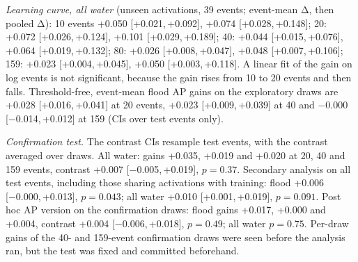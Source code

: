 \documentclass[journal,onecolumn]{IEEEtran}
\newcommand{\ci}[2]{[#1,\,#2]}
\begin{document}
\begin{table}[H]
\caption{Event-mean IoU regressed on $\log_2$ events and $\log_2$ tiles over all 38 exploratory training
draws (unseen activations; two-way 95\% CIs).}
\centering
{}
\end{table}

\emph{Learning curve, all water} (unseen activations, 39 events; event-mean Δ, then pooled Δ): 10 events
+0.050 \ci{+0.021}{+0.092}, +0.074 \ci{+0.028}{+0.148}; 20: +0.072 \ci{+0.026}{+0.124}, +0.101
\ci{+0.029}{+0.189}; 40: +0.044 \ci{+0.015}{+0.076}, +0.064 \ci{+0.019}{+0.132}; 80: +0.026
\ci{+0.008}{+0.047}, +0.048 \ci{+0.007}{+0.106}; 159: +0.023 \ci{+0.004}{+0.045}, +0.050
\ci{+0.003}{+0.118}. A linear fit of the gain on log events is not significant, because the gain rises
from 10 to 20 events and then falls. Threshold-free, event-mean flood AP gains on the exploratory draws are
+0.028 \ci{+0.016}{+0.041} at 20 events, +0.023 \ci{+0.009}{+0.039} at 40 and −0.000 \ci{−0.014}{+0.012} at
159 (CIs over test events only).

\emph{Confirmation test.} The contrast CIs resample test events, with the contrast averaged over draws.
All water: gains +0.035, +0.019 and +0.020 at 20, 40 and 159 events, contrast +0.007 \ci{−0.005}{+0.019},
$p = 0.37$. Secondary analysis on all test events, including those sharing activations with training:
flood +0.006 \ci{−0.000}{+0.013}, $p = 0.043$; all water +0.010 \ci{+0.001}{+0.019}, $p = 0.091$. Post hoc
AP version on the confirmation draws: flood gains +0.017, +0.000 and +0.004, contrast +0.004
\ci{−0.006}{+0.018}, $p = 0.49$; all water $p = 0.75$. Per-draw gains of the 40- and 159-event
confirmation draws were seen before the analysis ran, but the test was fixed and committed beforehand.
\end{document}
